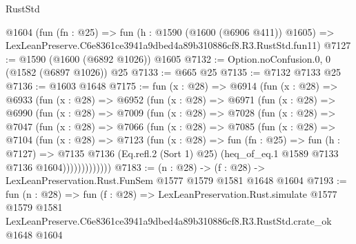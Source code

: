 \begin{lexlean}{RustStd}
\begin{coremodule}
    @1604
    (fun (fn : @25) =>
    fun (h : @1590 (@1600 (@6906 @411)) @1605) =>
    LexLeanPreserve.C6e8361ce3941a9dbed4a89b310886cf8.R3.RustStd.fun11)
@7127 := @1590 (@1600 (@6892 @1026)) @1605
@7132 := Option.noConfusion.{0, 0} (@1582 (@6897 @1026)) @25
@7133 := @665 @25
@7135 := @7132 @7133 @25
@7136 := @1603 @1648
@7175 := fun (x : @28) =>
  @6914
    (fun (x : @28) =>
    @6933
      (fun (x : @28) =>
      @6952
        (fun (x : @28) =>
        @6971
          (fun (x : @28) =>
          @6990
            (fun (x : @28) =>
            @7009
              (fun (x : @28) =>
              @7028
                (fun (x : @28) =>
                @7047
                  (fun (x : @28) =>
                  @7066
                    (fun (x : @28) =>
                    @7085
                      (fun (x : @28) =>
                      @7104
                        (fun (x : @28) =>
                        @7123
                          (fun (x : @28) =>
                          fun (fn : @25) =>
                          fun (h : @7127) =>
                          @7135
                            @7136
                            (Eq.refl.{2} (Sort 1) @25)
                            (heq_of_eq.{1} @1589 @7133 @7136 @1604)))))))))))))
@7183 := (n : @28) -> (f : @28) -> LexLeanPreservation.Rust.FunSem @1577 @1579 @1581 @1648 @1604
@7193 := fun (n : @28) =>
  fun (f : @28) =>
  LexLeanPreservation.Rust.simulate
    @1577
    @1579
    @1581
    LexLeanPreserve.C6e8361ce3941a9dbed4a89b310886cf8.R3.RustStd.crate_ok
    @1648
    @1604
\end{coremodule}
\end{lexlean}
